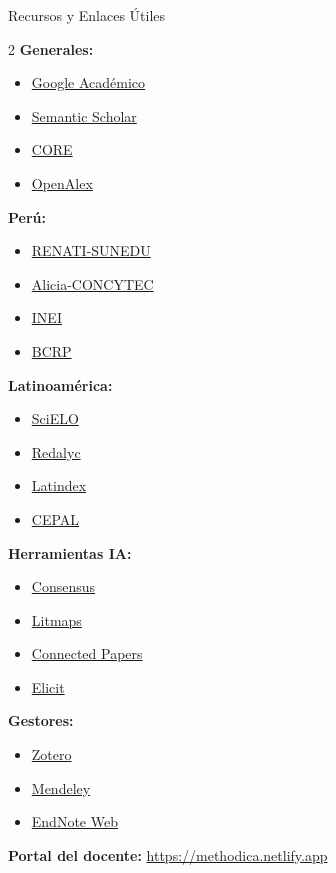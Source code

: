 \documentclass[11pt,aspectratio=169]{beamer}
\begin{document}
\begin{frame}{Recursos y Enlaces Útiles}
	\footnotesize
	\begin{multicols}{2}
		\textbf{Generales:}
		\begin{itemize}
			\item \href{https://scholar.google.com/}{Google Académico}
			\item \href{https://www.semanticscholar.org/}{Semantic Scholar}
			\item \href{https://core.ac.uk/}{CORE}
			\item \href{https://openalex.org/}{OpenAlex}
		\end{itemize}
		\textbf{Perú:}
		\begin{itemize}
			\item \href{https://renati.sunedu.gob.pe/}{RENATI-SUNEDU}
			\item \href{https://alicia.concytec.gob.pe/vufind}{Alicia-CONCYTEC}
			\item \href{https://www.gob.pe/inei}{INEI}
			\item \href{https://www.bcrp.gob.pe/}{BCRP}
		\end{itemize}
		\textbf{Latinoamérica:}
		\begin{itemize}
			\item \href{https://www.scielo.org/en}{SciELO}
			\item \href{https://www.redalyc.org/}{Redalyc}
			\item \href{https://www.latindex.org/latindex}{Latindex}
			\item \href{https://www.cepal.org/en}{CEPAL}
		\end{itemize}
		\textbf{Herramientas IA:}
		\begin{itemize}
			\item \href{https://consensus.app/}{Consensus}
			\item \href{https://www.litmaps.com/}{Litmaps}
			\item \href{https://www.connectedpapers.com/}{Connected Papers}
			\item \href{https://elicit.com/}{Elicit}
		\end{itemize}
		\textbf{Gestores:}
		\begin{itemize}
			\item \href{https://www.zotero.org/}{Zotero}
			\item \href{https://www.mendeley.com/}{Mendeley}
			\item \href{https://web.endnote.com/}{EndNote Web}
		\end{itemize}
	\end{multicols}
	\vspace{0.3cm}

	\textbf{Portal del docente:} \url{https://methodica.netlify.app}

\end{frame}
\end{document}
